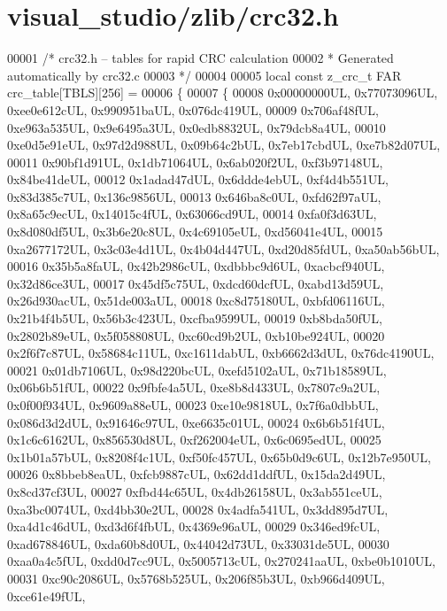 \hypertarget{visual__studio_2zlib_2crc32_8h_source}{}\section{visual\+\_\+studio/zlib/crc32.h}
\label{visual__studio_2zlib_2crc32_8h_source}

\begin{DoxyCode}
00001 \textcolor{comment}{/* crc32.h -- tables for rapid CRC calculation}
00002 \textcolor{comment}{ * Generated automatically by crc32.c}
00003 \textcolor{comment}{ */}
00004 
00005 local \textcolor{keyword}{const} z\_crc\_t FAR crc\_table[TBLS][256] =
00006 \{
00007   \{
00008     0x00000000UL, 0x77073096UL, 0xee0e612cUL, 0x990951baUL, 0x076dc419UL,
00009     0x706af48fUL, 0xe963a535UL, 0x9e6495a3UL, 0x0edb8832UL, 0x79dcb8a4UL,
00010     0xe0d5e91eUL, 0x97d2d988UL, 0x09b64c2bUL, 0x7eb17cbdUL, 0xe7b82d07UL,
00011     0x90bf1d91UL, 0x1db71064UL, 0x6ab020f2UL, 0xf3b97148UL, 0x84be41deUL,
00012     0x1adad47dUL, 0x6ddde4ebUL, 0xf4d4b551UL, 0x83d385c7UL, 0x136c9856UL,
00013     0x646ba8c0UL, 0xfd62f97aUL, 0x8a65c9ecUL, 0x14015c4fUL, 0x63066cd9UL,
00014     0xfa0f3d63UL, 0x8d080df5UL, 0x3b6e20c8UL, 0x4c69105eUL, 0xd56041e4UL,
00015     0xa2677172UL, 0x3c03e4d1UL, 0x4b04d447UL, 0xd20d85fdUL, 0xa50ab56bUL,
00016     0x35b5a8faUL, 0x42b2986cUL, 0xdbbbc9d6UL, 0xacbcf940UL, 0x32d86ce3UL,
00017     0x45df5c75UL, 0xdcd60dcfUL, 0xabd13d59UL, 0x26d930acUL, 0x51de003aUL,
00018     0xc8d75180UL, 0xbfd06116UL, 0x21b4f4b5UL, 0x56b3c423UL, 0xcfba9599UL,
00019     0xb8bda50fUL, 0x2802b89eUL, 0x5f058808UL, 0xc60cd9b2UL, 0xb10be924UL,
00020     0x2f6f7c87UL, 0x58684c11UL, 0xc1611dabUL, 0xb6662d3dUL, 0x76dc4190UL,
00021     0x01db7106UL, 0x98d220bcUL, 0xefd5102aUL, 0x71b18589UL, 0x06b6b51fUL,
00022     0x9fbfe4a5UL, 0xe8b8d433UL, 0x7807c9a2UL, 0x0f00f934UL, 0x9609a88eUL,
00023     0xe10e9818UL, 0x7f6a0dbbUL, 0x086d3d2dUL, 0x91646c97UL, 0xe6635c01UL,
00024     0x6b6b51f4UL, 0x1c6c6162UL, 0x856530d8UL, 0xf262004eUL, 0x6c0695edUL,
00025     0x1b01a57bUL, 0x8208f4c1UL, 0xf50fc457UL, 0x65b0d9c6UL, 0x12b7e950UL,
00026     0x8bbeb8eaUL, 0xfcb9887cUL, 0x62dd1ddfUL, 0x15da2d49UL, 0x8cd37cf3UL,
00027     0xfbd44c65UL, 0x4db26158UL, 0x3ab551ceUL, 0xa3bc0074UL, 0xd4bb30e2UL,
00028     0x4adfa541UL, 0x3dd895d7UL, 0xa4d1c46dUL, 0xd3d6f4fbUL, 0x4369e96aUL,
00029     0x346ed9fcUL, 0xad678846UL, 0xda60b8d0UL, 0x44042d73UL, 0x33031de5UL,
00030     0xaa0a4c5fUL, 0xdd0d7cc9UL, 0x5005713cUL, 0x270241aaUL, 0xbe0b1010UL,
00031     0xc90c2086UL, 0x5768b525UL, 0x206f85b3UL, 0xb966d409UL, 0xce61e49fUL,

\end{DoxyCode}
